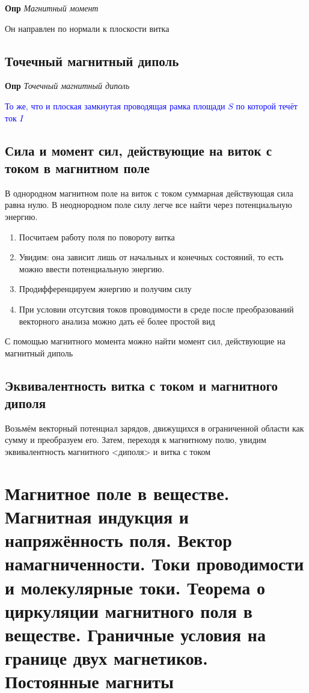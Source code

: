 \documentclass[a4paper, 14pt]{article}
\begin{document}
    \textbf{Опр} \textit{Магнитный момент}
    
    Он направлен по нормали к плоскости витка
    
    \subsection{Точечный магнитный диполь}
    
    \textbf{Опр} \textit{Точечный магнитный диполь}
    
    \textcolor{blue}{То же, что и плоская замкнутая проводящая рамка площади $S$ по которой течёт ток $I$}
    
    \subsection{Сила и момент сил, действующие на виток с током в магнитном поле}
    
    В однородном магнитном поле на виток с током суммарная действующая сила равна нулю.
    В неоднородном поле силу легче все найти через потенциальную энергию.
    
    \begin{enumerate}
        \item Посчитаем работу поля по повороту витка
        \item Увидим: она зависит лишь от начальных и конечных состояний, то есть можно ввести потенциальную энергию.
        \item Продифференцируем жнергию и получим силу
        \item При условии отсутсвия токов проводимости в среде после преобразований векторного анализа можно дать её
        более простой вид
    \end{enumerate}
    
    С помощью магнитного момента можно найти момент сил, действующие на магнитный диполь
    
    \subsection{Эквивалентность витка с током и магнитного диполя}
    
    Возьмём векторный потенциал зарядов, движущихся в ограниченной области как сумму и преобразуем его.
    Затем, переходя к магнитному полю, увидим эквивалентность магнитного <диполя> и витка с током
    
    \section{Магнитное поле в веществе.
    Магнитная индукция и напряжённость поля.
    Вектор намагниченности.
    Токи проводимости и молекулярные токи.
    Теорема о циркуляции магнитного поля в веществе.
    Граничные условия на границе двух магнетиков.
    Постоянные магниты}
    
\end{document}
